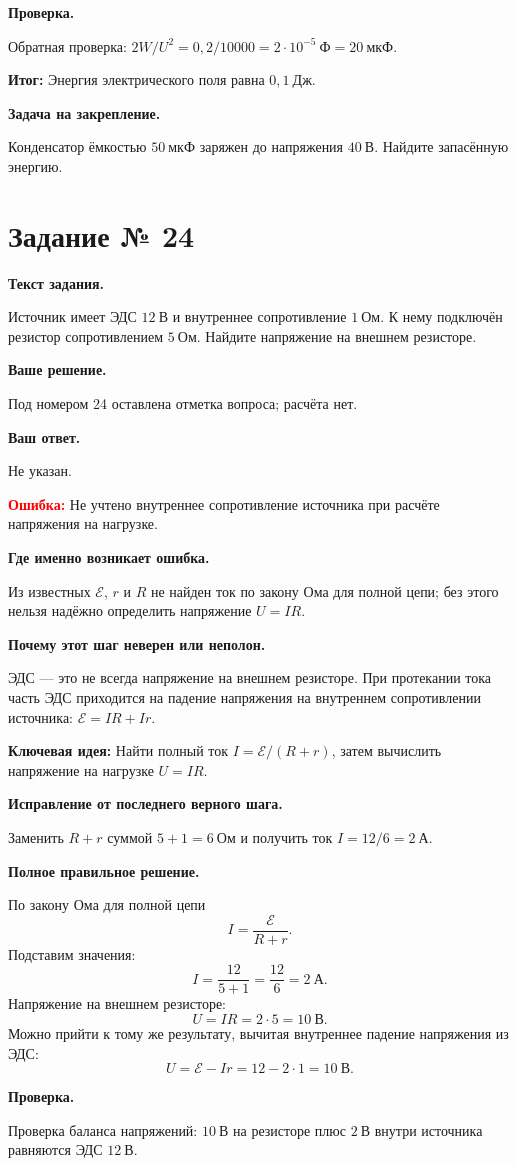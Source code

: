 \documentclass[11pt,a4paper]{article}
\newcommand{\reviewblock}[2]{\par\medskip\noindent\textbf{#1}\par\noindent#2\par}
\newcommand{\errorblock}[1]{\par\medskip\noindent\textcolor{red}{\textbf{Ошибка:}} #1\par}
\newcommand{\ideablock}[1]{\par\medskip\noindent\textcolor{blue!60!black}{\textbf{Ключевая идея:}} #1\par}
\newcommand{\resultblock}[1]{\par\medskip\noindent\textcolor{teal!60!black}{\textbf{Итог:}} #1\par}
\begin{document}
\reviewblock{Проверка.}{Обратная проверка: $2W/U^2=0{,}2/10000=2\cdot10^{-5}\ \text{Ф}=20\ \text{мкФ}$.}

\resultblock{Энергия электрического поля равна $0{,}1\ \text{Дж}$.}

\reviewblock{Задача на закрепление.}{Конденсатор ёмкостью $50\ \text{мкФ}$ заряжен до напряжения $40\ \text{В}$. Найдите запасённую энергию.}
\newpage
{}\label{task:24}

\section*{Задание № 24}

\reviewblock{Текст задания.}{Источник имеет ЭДС $12\ \text{В}$ и внутреннее сопротивление $1\ \text{Ом}$. К нему подключён резистор сопротивлением $5\ \text{Ом}$. Найдите напряжение на внешнем резисторе.}

\reviewblock{Ваше решение.}{Под номером 24 оставлена отметка вопроса; расчёта нет.}

\reviewblock{Ваш ответ.}{Не указан.}

\errorblock{Не учтено внутреннее сопротивление источника при расчёте напряжения на нагрузке.}

\reviewblock{Где именно возникает ошибка.}{Из известных $\mathcal{E}$, $r$ и $R$ не найден ток по закону Ома для полной цепи; без этого нельзя надёжно определить напряжение $U=IR$.}

\reviewblock{Почему этот шаг неверен или неполон.}{ЭДС --- это не всегда напряжение на внешнем резисторе. При протекании тока часть ЭДС приходится на падение напряжения на внутреннем сопротивлении источника: $\mathcal{E}=IR+Ir$.}

\ideablock{Найти полный ток $I=\mathcal{E}/(R+r)$, затем вычислить напряжение на нагрузке $U=IR$.}

\reviewblock{Исправление от последнего верного шага.}{Заменить $R+r$ суммой $5+1=6\ \text{Ом}$ и получить ток $I=12/6=2\ \text{А}$.}

\reviewblock{Полное правильное решение.}{По закону Ома для полной цепи
\[I=\frac{\mathcal{E}}{R+r}.\]
Подставим значения:
\[I=\frac{12}{5+1}=\frac{12}{6}=2\ \text{А}.\]
Напряжение на внешнем резисторе:
\[U=IR=2\cdot5=10\ \text{В}.\]
Можно прийти к тому же результату, вычитая внутреннее падение напряжения из ЭДС:
\[U=\mathcal{E}-Ir=12-2\cdot1=10\ \text{В}.\]}

\reviewblock{Проверка.}{Проверка баланса напряжений: $10\ \text{В}$ на резисторе плюс $2\ \text{В}$ внутри источника равняются ЭДС $12\ \text{В}$.}
\end{document}
